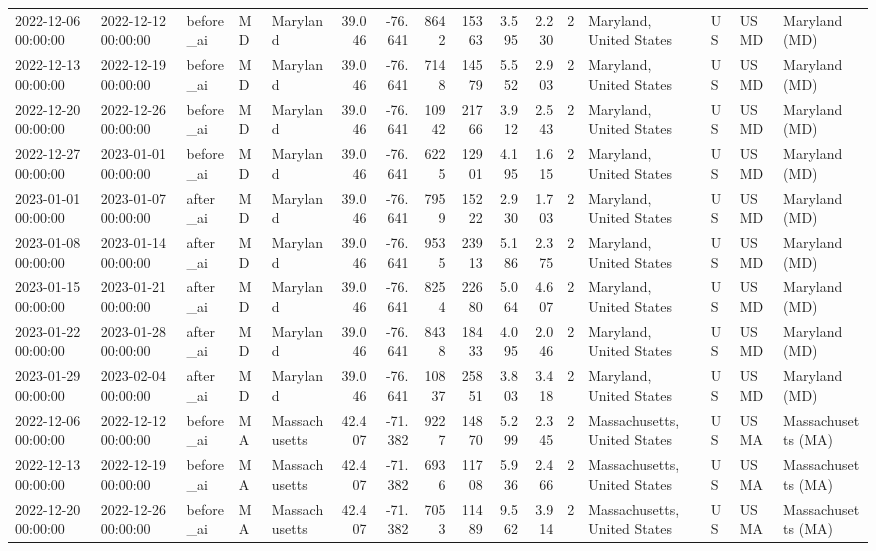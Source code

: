 \begin{tabular}{lllllrrrrrrlllll}
2022-12-06 00:00:00 & 2022-12-12 00:00:00 & before\_ai & MD & Maryland & 39.046 & -76.641 & 8642 & 15363 & 3.595 & 2.230 & 2 & Maryland, United States & US & USMD & Maryland (MD) \\
2022-12-13 00:00:00 & 2022-12-19 00:00:00 & before\_ai & MD & Maryland & 39.046 & -76.641 & 7148 & 14579 & 5.552 & 2.903 & 2 & Maryland, United States & US & USMD & Maryland (MD) \\
2022-12-20 00:00:00 & 2022-12-26 00:00:00 & before\_ai & MD & Maryland & 39.046 & -76.641 & 10942 & 21766 & 3.912 & 2.543 & 2 & Maryland, United States & US & USMD & Maryland (MD) \\
2022-12-27 00:00:00 & 2023-01-01 00:00:00 & before\_ai & MD & Maryland & 39.046 & -76.641 & 6225 & 12901 & 4.195 & 1.615 & 2 & Maryland, United States & US & USMD & Maryland (MD) \\
2023-01-01 00:00:00 & 2023-01-07 00:00:00 & after\_ai & MD & Maryland & 39.046 & -76.641 & 7959 & 15222 & 2.930 & 1.703 & 2 & Maryland, United States & US & USMD & Maryland (MD) \\
2023-01-08 00:00:00 & 2023-01-14 00:00:00 & after\_ai & MD & Maryland & 39.046 & -76.641 & 9535 & 23913 & 5.186 & 2.375 & 2 & Maryland, United States & US & USMD & Maryland (MD) \\
2023-01-15 00:00:00 & 2023-01-21 00:00:00 & after\_ai & MD & Maryland & 39.046 & -76.641 & 8254 & 22680 & 5.064 & 4.607 & 2 & Maryland, United States & US & USMD & Maryland (MD) \\
2023-01-22 00:00:00 & 2023-01-28 00:00:00 & after\_ai & MD & Maryland & 39.046 & -76.641 & 8438 & 18433 & 4.095 & 2.046 & 2 & Maryland, United States & US & USMD & Maryland (MD) \\
2023-01-29 00:00:00 & 2023-02-04 00:00:00 & after\_ai & MD & Maryland & 39.046 & -76.641 & 10837 & 25851 & 3.803 & 3.418 & 2 & Maryland, United States & US & USMD & Maryland (MD) \\
2022-12-06 00:00:00 & 2022-12-12 00:00:00 & before\_ai & MA & Massachusetts & 42.407 & -71.382 & 9227 & 14870 & 5.299 & 2.345 & 2 & Massachusetts, United States & US & USMA & Massachusetts (MA) \\
2022-12-13 00:00:00 & 2022-12-19 00:00:00 & before\_ai & MA & Massachusetts & 42.407 & -71.382 & 6936 & 11708 & 5.936 & 2.466 & 2 & Massachusetts, United States & US & USMA & Massachusetts (MA) \\
2022-12-20 00:00:00 & 2022-12-26 00:00:00 & before\_ai & MA & Massachusetts & 42.407 & -71.382 & 7053 & 11489 & 9.562 & 3.914 & 2 & Massachusetts, United States & US & USMA & Massachusetts (MA) \\

\end{tabular}
